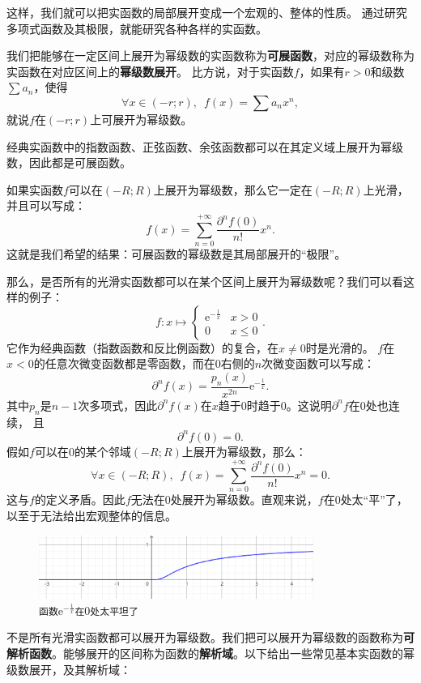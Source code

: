 \documentclass[12pt,UTF8]{ctexbook}
\begin{document}
这样，我们就可以把实函数的局部展开变成一个宏观的、整体的性质。
通过研究多项式函数及其极限，就能研究各种各样的实函数。

我们把能够在一定区间上展开为幂级数的实函数称为\textbf{可展函数}，对应的幂级数称为实函数在对应区间上的\textbf{幂级数展开}。
比方说，对于实函数$f$，如果有$r>0$和级数$\sum a_n$，使得
$$\forall x\in (-r;r),\,\,\, f(x) = \sum a_n x^n,$$
就说$f$在$(-r;r)$上可展开为幂级数。

经典实函数中的指数函数、正弦函数、余弦函数都可以在其定义域上展开为幂级数，因此都是可展函数。

如果实函数$f$可以在$(-R;R)$上展开为幂级数，那么它一定在$(-R;R)$上光滑，并且可以写成：
$$ f(x) = \sum_{n=0}^{+\infty} \frac{\partial^n f(0)}{n!} x^n. $$
这就是我们希望的结果：可展函数的幂级数是其局部展开的“极限”。

那么，是否所有的光滑实函数都可以在某个区间上展开为幂级数呢？我们可以看这样的例子：
$$ f: x\mapsto \begin{cases} \mathrm{e}^{-\frac{1}{x}} & x > 0 \\ 0 & x \leqslant 0 \end{cases}.$$
它作为经典函数（指数函数和反比例函数）的复合，在$x\neq 0$时是光滑的。
$f$在$x<0$的任意次微变函数都是零函数，而在$0$右侧的$n$次微变函数可以写成：
$$ \partial^n f(x) = \frac{p_n(x)}{x^{2n}} \mathrm{e}^{-\frac{1}{x}}.$$
其中$p_n$是$n-1$次多项式，因此$\partial^n f(x)$在$x$趋于$0$时趋于$0$。这说明$\partial^n f$在$0$处也连续，
且
$$ \partial^n f(0) = 0.$$
假如$f$可以在$0$的某个邻域$(-R;R)$上展开为幂级数，那么：
$$ \forall x \in (-R;R) ,\,\,\, f(x) = \sum_{n=0}^{+\infty} \frac{\partial^n f(0)}{n!} x^n = 0. $$
这与$f$的定义矛盾。因此$f$无法在$0$处展开为幂级数。直观来说，$f$在$0$处太“平”了，以至于无法给出宏观整体的信息。

\begin{figure}[h] %
    \centering
    \includegraphics[width=0.8\textwidth]{tu/幂级数2.png}
    \caption*{\texttt{函数}$\displaystyle \mathrm{e}^{-\frac{1}{x}}$\texttt{在}$0$\texttt{处太平坦了}}
\end{figure}

不是所有光滑实函数都可以展开为幂级数。我们把可以展开为幂级数的函数称为\textbf{可解析函数}。能够展开的区间称为函数的\textbf{解析域}。以下给出一些常见基本实函数的幂级数展开，及其解析域：
\end{document}
